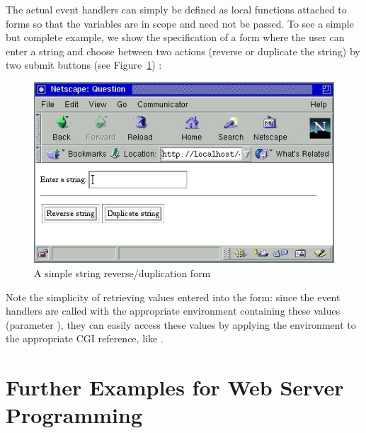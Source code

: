 The actual event handlers can simply be defined as local functions
attached to forms so that the  variables are in scope
and need not be passed.
To see a simple but complete example, we show the specification of
a form where the user can enter a string and choose between two
actions (reverse or duplicate the string) by two submit buttons
(see Figure~\ref{fig-revdup}) :
%
\begin{figure}[t]
\begin{center}
\includegraphics[scale=0.8]{PICTURES/revdup.jpg}
\end{center}\vspace{-3ex}
\caption{A simple string reverse/duplication form\label{fig-revdup}}
\end{figure}
%
%
Note the simplicity of retrieving values entered into the form:
since the event handlers are called with the appropriate environment
containing these values (parameter ),
they can easily access these values
by applying the environment to the appropriate CGI reference,
like .


\section{Further Examples for Web Server Programming}

